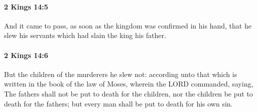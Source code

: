 		\paragraph{2 Kings 14:5} %
			\label{2KINGS-14-5}

			And it came to pass, as soon as the kingdom was confirmed in his hand, that he slew his servants which had slain the king his father.


		\paragraph{2 Kings 14:6} %
			\label{2KINGS-14-6}

			But the children of the murderers he slew not: according unto that which is written in the book of the law of Moses, wherein the LORD commanded, saying, The fathers shall not be put to death for the children, nor the children be put to death for the fathers; but every man shall be put to death for his own sin.

